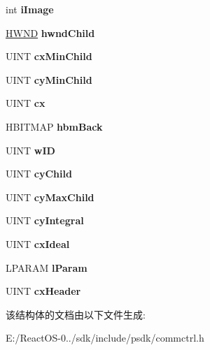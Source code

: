 \begin{DoxyCompactItemize}
int {\bfseries i\+Image}
\item 
\mbox{\label{structtag_r_e_b_a_r_b_a_n_d_i_n_f_o_a_a8fea53cffd2811900fef6a5e2303c74d}} 
\hyperlink{interfacevoid}{H\+W\+ND} {\bfseries hwnd\+Child}
\item 
\mbox{\label{structtag_r_e_b_a_r_b_a_n_d_i_n_f_o_a_a97418518da67ab296dc3ac46cd319890}} 
U\+I\+NT {\bfseries cx\+Min\+Child}
\item 
\mbox{\label{structtag_r_e_b_a_r_b_a_n_d_i_n_f_o_a_ac6f3dba56e8743afea8d0553e5d3d922}} 
U\+I\+NT {\bfseries cy\+Min\+Child}
\item 
\mbox{\label{structtag_r_e_b_a_r_b_a_n_d_i_n_f_o_a_aa72be246bd393153a01b2836727df177}} 
U\+I\+NT {\bfseries cx}
\item 
\mbox{\label{structtag_r_e_b_a_r_b_a_n_d_i_n_f_o_a_ae74d39d4eb530db7b237459b93cc3865}} 
H\+B\+I\+T\+M\+AP {\bfseries hbm\+Back}
\item 
\mbox{\label{structtag_r_e_b_a_r_b_a_n_d_i_n_f_o_a_ade2cc282046a4a17316f5f9774437cb9}} 
U\+I\+NT {\bfseries w\+ID}
\item 
\mbox{\label{structtag_r_e_b_a_r_b_a_n_d_i_n_f_o_a_a0b1e9d49d5c699886060b334f7cc6e7b}} 
U\+I\+NT {\bfseries cy\+Child}
\item 
\mbox{\label{structtag_r_e_b_a_r_b_a_n_d_i_n_f_o_a_a248b970a098fba8522649c60e8415eaf}} 
U\+I\+NT {\bfseries cy\+Max\+Child}
\item 
\mbox{\label{structtag_r_e_b_a_r_b_a_n_d_i_n_f_o_a_a2ca128c497d9ac9be4d524f5f3c3c2c6}} 
U\+I\+NT {\bfseries cy\+Integral}
\item 
\mbox{\label{structtag_r_e_b_a_r_b_a_n_d_i_n_f_o_a_acb692684e071f06bdb50adc48cb586aa}} 
U\+I\+NT {\bfseries cx\+Ideal}
\item 
\mbox{\label{structtag_r_e_b_a_r_b_a_n_d_i_n_f_o_a_a0731b4f517214fec266bc50025239778}} 
L\+P\+A\+R\+AM {\bfseries l\+Param}
\item 
\mbox{\label{structtag_r_e_b_a_r_b_a_n_d_i_n_f_o_a_a65987ab55bb828d5f106182b5c3eeda8}} 
U\+I\+NT {\bfseries cx\+Header}
\end{DoxyCompactItemize}


该结构体的文档由以下文件生成\+:\begin{DoxyCompactItemize}
\item 
E\+:/\+React\+O\+S-\/0../sdk/include/psdk/commctrl.\+h\end{DoxyCompactItemize}
